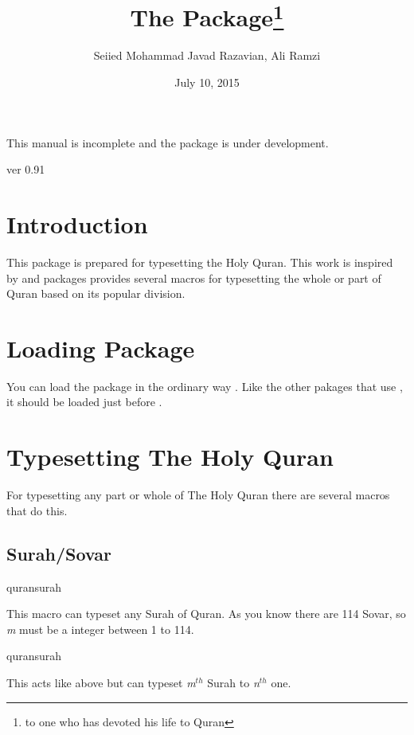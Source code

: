 \documentclass{ltxdoc}
\begin{document}
\title{The  Package\footnote{to one who has devoted his life to Quran}}
\author{Seiied Mohammad Javad Razavian, Ali Ramzi\\}

\date{July 10, 2015}
\maketitle

\begin{framed}
This manual is incomplete and the package is under development. \par 
\centerline{ver 0.91}
\end{framed}

\tableofcontents

\section{Introduction}
This package is prepared for typesetting the Holy Quran. This work is inspired by  and 
 packages provides several macros for
typesetting the whole or part of Quran based on its popular division.

\section{Loading Package}
You can load the package in the ordinary way
.
Like the other pakages that use , it should be loaded just before .

\section{Typesetting The Holy Quran}
For typesetting any part or whole of The Holy Quran there are several macros that do this.

\subsection{Surah/Sovar}
\begin{declcs}{quransurah}
\end{declcs}
This macro can typeset any Surah of Quran. As you know there are 114 Sovar, so \textit{m} must be a integer between
1 to 114. 

\begin{declcs}{quransurah}
\end{declcs}
This acts like above but can typeset \textit{m}$^{th}$ Surah to \textit{n}$^{th}$  one. 
\end{document}
